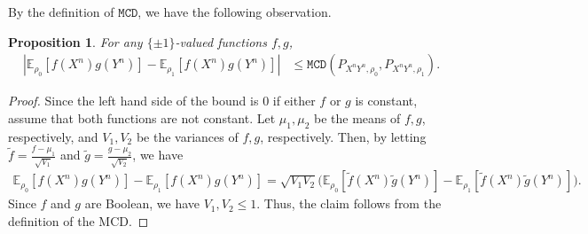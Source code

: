 \documentclass[journal,draftcls, onecolumn]{IEEEtran}
\newtheorem{proposition}{Proposition}
\begin{document}
By the definition of $\mathtt{MCD}$, we have the following observation.
\begin{proposition}\label{prop:mcd}
For any $\{\pm1\}$-valued functions $f,g$, 
\begin{align*}
|\mathbb{E}_{\rho_{0}}[f(X^{n})g(Y^{n})]-\mathbb{E}_{\rho_{1}}[f(X^{n})g(Y^{n})]| & \le \mathtt{MCD}(P_{X^nY^n,\rho_0},P_{X^nY^n,\rho_1}).
\end{align*}
\end{proposition}
\begin{proof}
  Since the left hand side of the bound is $0$ if either $f$ or $g$ is constant, assume that both functions are not constant. 
  Let $\mu_1,\mu_2$ be the means of $f,g$, respectively, and   $V_1,V_2$ be the variances of $f,g$, respectively. Then, 
  by letting $\tilde{f}=\frac{f-\mu_1}{\sqrt{V_1}}$ and $\tilde{g}=\frac{g-\mu_2}{\sqrt{V_2}}$,
  we have 
  \begin{align*}
  \mathbb{E}_{\rho_{0}}[f(X^{n})g(Y^{n})]-\mathbb{E}_{\rho_{1}}[f(X^{n})g(Y^{n})]
  = \sqrt{V_1V_2}
  \big(\mathbb{E}_{\rho_{0}}[\tilde{f}(X^{n}) \tilde{g}(Y^{n})]-\mathbb{E}_{\rho_{1}}[\tilde{f}(X^{n}) \tilde{g}(Y^{n})]\big).
  \end{align*}
  Since $f$ and $g$ are Boolean, we have $V_1,V_2 \le 1$. Thus, the claim follows from the definition of the MCD.
\end{proof}
\end{document}
